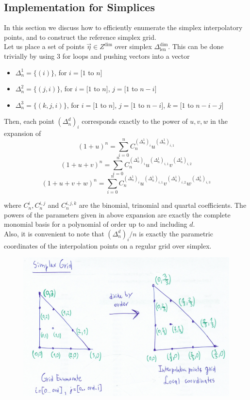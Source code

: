 \subsection{Implementation for Simplices}
\label{subsection-simplexgrid}

\noindent
In this section we discuss how to efficiently enumerate the simplex interpolatory points, and to construct the reference simplex grid. \\

\noindent
Let us place a set of points $\vec{\eta} \in Z^{\dim}$ over simplex $\Delta^{\dim}_{\mathrm{len}}$. This can be done trivially
by using 3 for loops and pushing vectors into a vector
\begin{itemize}
	\item $\Delta^{1}_n = \{(i)\}$, for $i = [1$ to $n]$
	\item $\Delta^{2}_n = \{(j,i)\}$, for $i = [1$ to $n]$, $j = [1$ to $n - i]$
	\item $\Delta^{3}_n = \{(k,j,i)\}$, for $i = [1$ to $n]$, $j = [1$ to $n - i]$, $k = [1$ to $n - i - j]$
\end{itemize}

\noindent
Then, each point $(\Delta^{d}_n)_i$ corresponds exactly to the power of $u,v,w$ in the expansion of
\[ (1 + u)^n = \sum_{i=0}^n C^{(\Delta^{1}_n)_i}_n u^{(\Delta^{1}_n)_{i,1}} \]
\[ (1 + u + v)^n = \sum_{i=0}^n C^{(\Delta^{1}_n)_i}_n u^{(\Delta^{1}_n)_{i,1}} v^{(\Delta^{1}_n)_{i,2}} \]
\[ (1 + u + v + w)^n = \sum_{i=0}^n C^{(\Delta^{1}_n)_i}_n u^{(\Delta^{1}_n)_{i,1}} v^{(\Delta^{1}_n)_{i,2}} w^{(\Delta^{1}_n)_{i,3}} \]

\noindent
where $C^{i}_n, C^{i,j}_n$ and $C^{i,j,k}_n$ are the binomial, trinomial and quartal coefficients. The powers of the parameters given in above expansion are exactly the complete monomial basis for a polynomial of order up to and including $d$. \\

\noindent
Also, it is convenient to note that $(\Delta^{d}_n)_i / n$ is exactly the parametric coordinates of the interpolation points on a regular grid over simplex. 

\begin{figure}[hp]
    \centering
    \includegraphics[scale=0.5]{images/pic-simplex-grid.png}
\end{figure}

